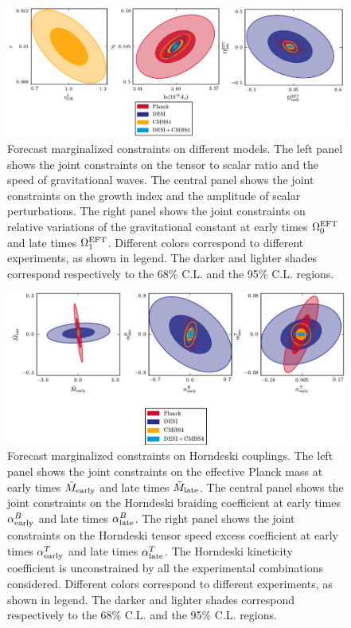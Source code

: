 \begin{figure}[!tb]
\begin{center}
\includegraphics[width=1.0\textwidth]{DarkEnergy/2_mixed}
\caption{Forecast marginalized constraints on different models. The left panel shows the joint constraints on the tensor to scalar ratio and the speed of gravitational waves. The central panel shows the joint constraints on the growth index and the amplitude of scalar perturbations. The right panel shows the joint constraints on relative variations of the gravitational constant at early times $\Omega_0^{\rm EFT}$ and late times $\Omega_1^{\rm EFT}$. Different colors correspond to different experiments, as shown in legend. The darker and lighter shades correspond respectively to the 68\% C.L. and the 95\% C.L. regions.}\label{fig:MixedDEG}
\end{center}
\end{figure}

\begin{figure}[!tb]
\begin{center}
\includegraphics[width=1.0\textwidth]{DarkEnergy/11_alpha_atan}
\caption{Forecast marginalized constraints on Horndeski couplings. The left panel shows the joint constraints on the effective Planck mass at early times $\tilde{M}_{\rm early}$ and late times $\tilde{M}_{\rm late}$. The central panel shows the joint constraints on the Horndeski braiding coefficient at early times $\alpha^{B}_{\rm early}$ and late times  $\alpha^{B}_{\rm late}$. The right panel shows the joint constraints on the Horndeski tensor speed excess coefficient at early times $\alpha^{T}_{\rm early}$ and late times  $\alpha^{T}_{\rm late}$. The Horndeski kineticity coefficient is unconstrained by all the experimental combinations considered. Different colors correspond to different experiments, as shown in legend. The darker and lighter shades correspond respectively to the 68\% C.L. and the 95\% C.L. regions.}\label{fig:VariationAlpha}
\end{center}
\end{figure}


